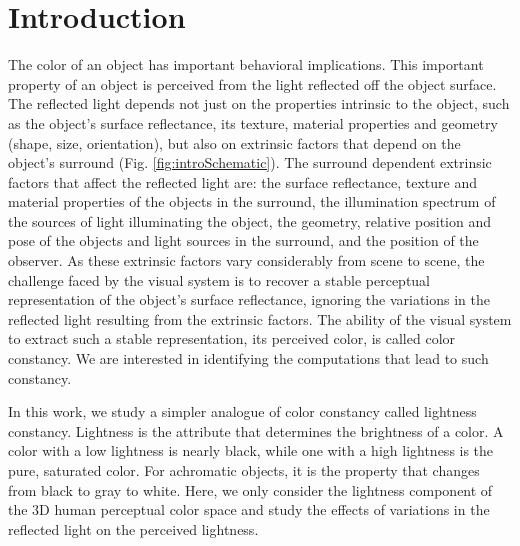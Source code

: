 \documentclass{jov}
\begin{document}

\maketitle

\section{Introduction}
The color of an object has important behavioral implications. This important property of an object is perceived from the light reflected off the object surface. The reflected light depends not just on the properties intrinsic to the object, such as the object's surface reflectance, its texture, material properties and geometry (shape, size, orientation), but also on extrinsic factors that depend on the object's surround (Fig. \ref{fig:introSchematic}). The surround dependent extrinsic factors that affect the reflected light are: the surface reflectance, texture and material properties of the objects in the surround, the illumination spectrum of the sources of light illuminating the object, the geometry, relative position and pose of the objects and light sources in the surround, and the position of the observer. As these extrinsic factors vary considerably from scene to scene, the challenge faced by the visual system is to recover a stable perceptual representation of the object's surface reflectance, ignoring the  variations in the reflected light resulting from the extrinsic factors. The ability of the visual system to extract such a stable representation, its perceived color, is called color constancy. We are interested in identifying the computations that lead to such constancy.

In this work, we study a simpler analogue of color constancy called lightness constancy. Lightness is the attribute that determines the brightness of a color. A color with a low lightness is nearly black, while one with a high lightness is the pure, saturated color. For achromatic objects, it is the property that changes from black to gray to white. Here, we only consider the lightness component of the  3D human perceptual color space and study the effects of variations in the reflected light on the perceived lightness.
\end{document}
